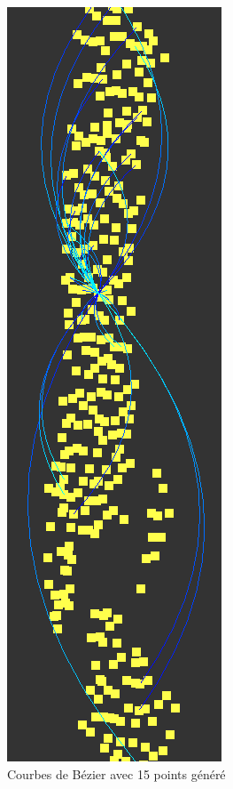 \documentclass[12pt]{article}
\begin{document}
		\begin{figure}[!h]
		\begin{center}
		\includegraphics[scale=.60]{15_generated_points.png}
		\caption{Courbes de Bézier avec 15 points généré}
		\end{center}
		\end{figure}
		
\end{document}
